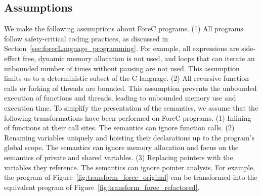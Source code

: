 \subsection{Assumptions}
\label{sec:formalSemantics_assumptions}
We make the following assumptions about ForeC programs. 
(1) All programs follow safety-critical coding practices,
as discussed in Section~\ref{sec:forecLanguage_programming}.
For example, all expressions are side-effect free, 
dynamic memory allocation is not used, and loops that can 
iterate an unbounded number of times without pausing are not used.
This assumption limits us to a deterministic subset of the 
C language.
(2) All recursive function calls or forking of threads are bounded.
This assumption prevents the unbounded 
execution of functions and threads, leading to unbounded
memory use and execution time. 
To simplify the presentation of the semantics, we assume that the 
following transformations have been performed on ForeC programs. 
(1) Inlining of functions at their call sites. The semantics can
ignore function calls.
(2) Renaming variables uniquely and hoisting their declarations 
up to the program's global scope. The semantics can ignore 
memory allocation and focus on the semantics of private and 
shared variables.
(3) Replacing pointers with the variables they reference. The 
semantics can ignore pointer analysis.
For example, the program of 
Figure~\ref{fig:transform_forec_original} can be
transformed into the equivalent program of 
Figure~\ref{fig:transform_forec_refactored}.



